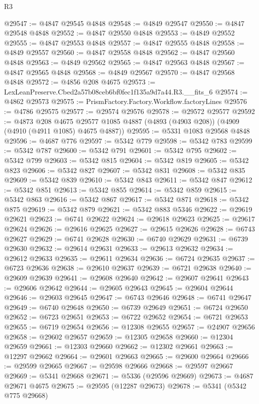 \begin{lexlean}{R3}
\begin{coremodule}
@29547 := @4847 @29545 @4848
@29548 := @4849 @29547
@29550 := @4847 @29548 @4848
@29552 := @4847 @29550 @4848
@29553 := @4849 @29552
@29555 := @4847 @29553 @4848
@29557 := @4847 @29555 @4848
@29558 := @4849 @29557
@29560 := @4847 @29558 @4848
@29562 := @4847 @29560 @4848
@29563 := @4849 @29562
@29565 := @4847 @29563 @4848
@29567 := @4847 @29565 @4848
@29568 := @4849 @29567
@29570 := @4847 @29568 @4848
@29572 := @4856 @208 @4675
@29573 := LexLeanPreserve.Cbed2a57b08ceb6bf0fec1f135a9d7a44.R3.__fits_6
@29574 := @4862 @29573
@29575 := PrismFactory.Factory.Workflow.factoryLines
@29576 := @4786 @29575
@29577 := @29574 @29576
@29578 := @29572 @29577
@29592 := @4873
    @208
    @4675
    @29577
    @1085
    @4887
    (@4893 (@4903 @208))
    (@4909 (@4910 (@4911 @1085) @4675 @4887))
@29595 := @5331 @1083 @29568 @4848
@29596 := @4687 @776
@29597 := @5342 @779
@29598 := @5342 @783
@29599 := @5342 @787
@29600 := @5342 @791
@29601 := @5342 @795
@29602 := @5342 @799
@29603 := @5342 @815
@29604 := @5342 @819
@29605 := @5342 @823
@29606 := @5342 @827
@29607 := @5342 @831
@29608 := @5342 @835
@29609 := @5342 @839
@29610 := @5342 @843
@29611 := @5342 @847
@29612 := @5342 @851
@29613 := @5342 @855
@29614 := @5342 @859
@29615 := @5342 @863
@29616 := @5342 @867
@29617 := @5342 @871
@29618 := @5342 @875
@29619 := @5342 @879
@29621 := @5342 @883 @5346
@29622 := @29619 @29621
@29623 := @6741 @29622
@29624 := @29618 @29623
@29625 := @29617 @29624
@29626 := @29616 @29625
@29627 := @29615 @29626
@29628 := @6743 @29627
@29629 := @6741 @29628
@29630 := @6740 @29629
@29631 := @6739 @29630
@29632 := @29614 @29631
@29633 := @29613 @29632
@29634 := @29612 @29633
@29635 := @29611 @29634
@29636 := @6724 @29635
@29637 := @6723 @29636
@29638 := @29610 @29637
@29639 := @6721 @29638
@29640 := @29609 @29639
@29641 := @29608 @29640
@29642 := @29607 @29641
@29643 := @29606 @29642
@29644 := @29605 @29643
@29645 := @29604 @29644
@29646 := @29603 @29645
@29647 := @6743 @29646
@29648 := @6741 @29647
@29649 := @6740 @29648
@29650 := @6739 @29649
@29651 := @6724 @29650
@29652 := @6723 @29651
@29653 := @6722 @29652
@29654 := @6721 @29653
@29655 := @6719 @29654
@29656 := @12308 @29655
@29657 := @24907 @29656
@29658 := @29602 @29657
@29659 := @12305 @29658
@29660 := @12304 @29659
@29661 := @12303 @29660
@29662 := @12302 @29661
@29663 := @12297 @29662
@29664 := @29601 @29663
@29665 := @29600 @29664
@29666 := @29599 @29665
@29667 := @29598 @29666
@29668 := @29597 @29667
@29669 := @5341 @29668
@29671 := @5336 (@29596 @29669)
@29673 := @4687 @29671 @4675
@29675 := @29595 (@12287 @29673)
@29678 := @5341 (@5342 @775 @29668)

\end{coremodule}
\end{lexlean}
